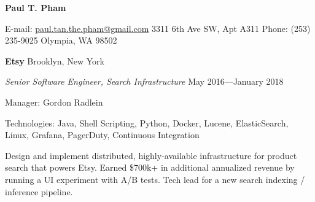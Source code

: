 \documentclass[letter]{article}
\begin{document}
\thispagestyle{empty}           %

\reversemarginpar		%

{\LARGE {\bf Paul T. Pham}}
\par
\vspace{.25in}
E-mail: \href{mailto:paul.tan.the.pham@gmail.com}{paul.tan.the.pham@gmail.com}
\hspace*{\fill}
3311 6th Ave SW, Apt A311
\linebreak
Phone: (253) 235-9025
\hspace*{\fill}
Olympia, WA 98502

\par
\vspace{.25in}

\vspace{\baselineskip}
{\bf {Etsy}} \hfill Brooklyn, New York
\par
{\em Senior Software Engineer, Search Infrastructure} \hfill May 2016---January 2018
\par
Manager: Gordon Radlein
\vspace{0.5\baselineskip}
\par
Technologies: Java, Shell Scripting, Python, Docker, Lucene, ElasticSearch, Linux, Grafana, PagerDuty, Continuous Integration
\vspace{0.5\baselineskip}
\par
Design and implement distributed, highly-available infrastructure for product search that powers Etsy. Earned \$700k+ in additional annualized revenue by running a UI experiment with A/B tests. Tech lead for a new search indexing / inference pipeline.
\end{document}
